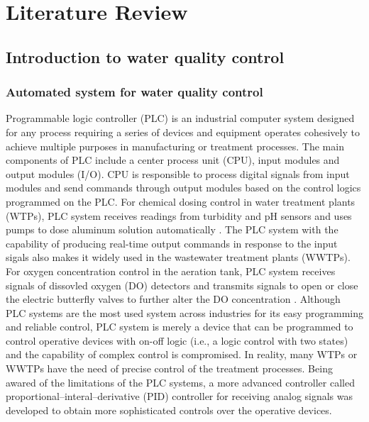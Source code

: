 \chapter{Literature Review}
\section{Introduction to water quality control}
\subsection{Automated system for water quality control}
Programmable logic controller (PLC) is an industrial computer system designed for any process requiring a series of devices and equipment operates cohesively to achieve multiple purposes in manufacturing or treatment processes. The main components of PLC include a center process unit (CPU), input modules and output modules (I/O). CPU is responsible to process digital signals from input modules and send commands through output modules based on the control logics programmed on the PLC. For chemical dosing control in water treatment plants (WTPs), PLC system receives readings from turbidity and pH sensors and uses pumps to dose aluminum solution automatically \citep{andhareSCADAToolIncrease2014}. The PLC system with the capability of producing real-time output commands in response to the input sigals also makes it widely used in the wastewater treatment plants (WWTPs). For oxygen concentration control in the aeration tank, PLC system receives signals of dissovled oxygen (DO) detectors and transmits signals to open or close the electric butterfly valves to further alter the DO concentration \citep{zhuApplicationPLCSewage2017}. Although PLC systems are the most used system across industries for its easy programming and reliable control, PLC system is merely a device that can be programmed to control operative devices with on-off logic (i.e., a logic control with two states) and the capability of complex control is compromised. In reality, many WTPs or WWTPs have the need of precise control of the treatment processes. Being awared of the limitations of the PLC systems, a more advanced controller called proportional–interal–derivative (PID) controller for receiving analog signals was developed to obtain more sophisticated controls over the operative devices.

